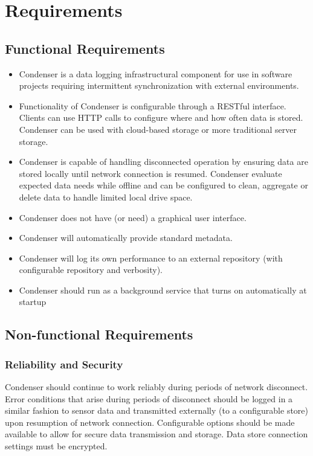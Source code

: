 \section{Requirements}
	
	\subsection{Functional Requirements}
\begin{itemize}
\item Condenser is a data logging infrastructural component for use in software projects requiring intermittent synchronization with external environments. 

\item Functionality of Condenser is configurable through a RESTful interface. Clients can use HTTP calls to configure where and how often data is stored. Condenser can be used with cloud-based storage or more traditional server storage.

\item Condenser is capable of handling disconnected operation by ensuring data are stored locally until network connection is resumed. Condenser evaluate expected data needs while offline and can be configured to clean, aggregate or delete data to handle limited local drive space.

\item Condenser does not have (or need) a graphical user interface. 

\item Condenser will automatically provide standard metadata.

\item Condenser will log its own performance to an external repository (with configurable repository and verbosity).

\item Condenser should run as a background service that turns on automatically at startup
\end{itemize}
	\subsection{Non-functional Requirements}
		\subsubsection{Reliability and Security}
Condenser should continue to work reliably during periods of network disconnect. Error conditions that arise during periods of disconnect should be logged in a similar fashion to sensor data and transmitted externally (to a configurable store) upon resumption of network connection. Configurable options should be made available to allow for secure data transmission and storage. Data store connection settings must be encrypted.		
